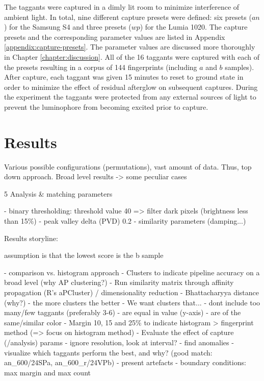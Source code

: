 \documentclass[thesis.tex]{subfiles}
\begin{document}
The taggants were captured in a dimly lit room to minimize interference of ambient light. In total, nine different capture presets were defined: six presets ($an$) for the Samsung S4 and three presets ($wp$) for the Lumia 1020. The capture presets and the corresponding parameter values are listed in Appendix \ref{appendix:capture-presets}. The parameter values are discussed more thoroughly in Chapter \ref{chapter:discussion}. All of the 16 taggants were captured with each of the presets resulting in a corpus of 144 fingerprints (including $a$ and $b$ samples). After capture, each taggant was given 15 minutes to reset to ground state in order to minimize the effect of residual afterglow on subsequent captures. During the experiment the taggants were protected from any external sources of light to prevent the luminophore from becoming excited prior to capture.

\section{Results}
\label{chapter:results}

Various possible configurations (permutations), vast amount of data. Thus, top down approach. Broad level results -> some peculiar cases


5 Analysis \& matching parameters

- binary thresholding: threshold value 40 => filter dark pixels (brightness less than 15\%)
- peak valley delta (PVD) 0.2
- similarity parameters (damping...)

Results storyline:

assumption is that the lowest score is the b sample

- comparison vs. histogram approach
- Clusters to indicate pipeline accuracy on a broad level (why AP clustering?)
  - Run similarity matrix through affinity propagation (R's aPCluster) / dimensionality reduction
  - Bhattacharyya distance (why?)
  - the more clusters the better
  - We want clusters that...
    - dont include too many/few taggants (preferably 3-6)
    - are equal in value (y-axis)
    - are of the same/similar color
- Margin 10, 15 and 25\% to indicate histogram > fingerprint method (=> focus on histogram method)
- Evaluate the effect of capture (/analysis) params
  - ignore resolution, look at interval?
  - find anomalies
  - visualize which taggants perform the best, and why? (good match: an\_600/24SPa, an\_600\_r/24VPb)
- present artefacts
- boundary conditions: max margin and max count
\end{document}
